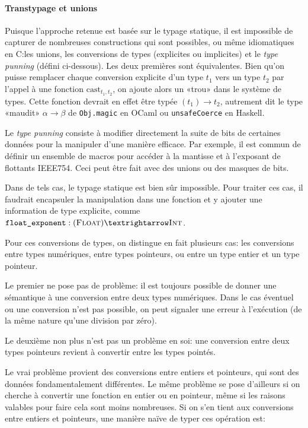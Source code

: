 \paragraph{Transtypage et unions}

Puisque l'approche retenue est basée sur le typage statique, il est impossible
de capturer de nombreuses constructions qui sont possibles, ou même idiomatiques
en C:\@ les unions, les conversions de types (explicites ou implicites) et le
\emph{type punning} (défini ci-dessous). Les deux premières sont équivalentes.
Bien qu'on puisse remplacer chaque conversion explicite d'un type $t_1$ vers un
type $t_2$ par l'appel à une fonction $\mathrm{cast}_{t_1,t_2}$, on ajoute alors
un «trou» dans le système de types. Cette fonction devrait en effet être typée
$(t_1) → t_2$, autrement dit le type «maudit» $α → β$ de \texttt{Obj.magic} en
OCaml ou \texttt{unsafeCoerce} en Haskell.

Le \emph{type punning} consiste à modifier directement la suite de bits de
certaines données pour la manipuler d'une manière efficace. Par exemple, il est
commun de définir un ensemble de macros pour accéder à la mantisse et à
l'exposant de flottants IEEE754. Ceci peut être fait avec des unions ou des
masques de bits.

Dans de tels cas, le typage statique est bien sûr impossible. Pour traiter ces
cas, il faudrait encapsuler la manipulation dans une fonction et y ajouter une
information de type explicite, comme $\texttt{float\_exponent} : (\tFloat) →
\tInt$.

Pour ces conversions de types, on distingue en fait plusieurs cas: les
conversions entre types numériques, entre types pointeurs, ou entre un type
entier et un type pointeur.

Le premier ne pose pas de problème: il est toujours possible de donner une
sémantique à une conversion entre deux types numériques. Dans le cas éventuel ou
une conversion n'est pas possible, on peut signaler une erreur à l'exécution (de
la même nature qu'une division par zéro).

Le deuxième non plus n'est pas un problème en soi: une conversion entre deux
types pointeurs revient à convertir entre les types pointés.

Le vrai problème provient des conversions entre entiers et pointeurs, qui sont
des données fondamentalement différentes. Le même problème se pose d'ailleurs si
on cherche à convertir une fonction en entier ou en pointeur, même si les
raisons valables pour faire cela sont moins nombreuses.
Si on s'en tient aux conversions entre entiers et pointeurs, une manière naïve
de typer ces opération est:

